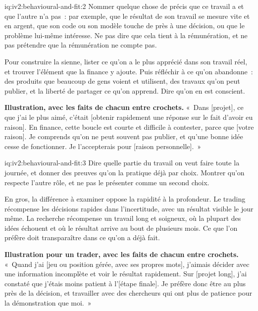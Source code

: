 \begin{solution}{iq:iv2:behavioural-and-fit:2}
Nommer quelque chose de précis que ce travail a et que l'autre n'a pas~: par exemple, que le résultat de son travail se mesure vite et en argent, que son code ou son modèle touche de près à une décision, ou que le problème lui-même intéresse. Ne pas dire que cela tient à la rémunération, et ne pas prétendre que la rémunération ne compte pas.

Pour construire la sienne, lister ce qu'on a le plus apprécié dans son travail réel, et trouver l'élément que la finance y ajoute. Puis réfléchir à ce qu'on abandonne~: des produits que beaucoup de gens voient et utilisent, des travaux qu'on peut publier, et la liberté de partager ce qu'on apprend. Dire qu'on en est conscient.

\textbf{Illustration, avec les faits de chacun entre crochets.} «~Dans [projet], ce que j'ai le plus aimé, c'était [obtenir rapidement une réponse sur le fait d'avoir eu raison]. En finance, cette boucle est courte et difficile à contester, parce que [votre raison]. Je comprends qu'on ne peut souvent pas publier, et qu'une bonne idée cesse de fonctionner. Je l'accepterais pour [raison personnelle].~»

\end{solution}

\begin{solution}{iq:iv2:behavioural-and-fit:3}
Dire quelle partie du travail on veut faire toute la journée, et donner des preuves qu'on la pratique déjà par choix. Montrer qu'on respecte l'autre rôle, et ne pas le présenter comme un second choix.

En gros, la différence à examiner oppose la rapidité à la profondeur. Le trading récompense les décisions rapides dans l'incertitude, avec un résultat visible le jour même. La recherche récompense un travail long et soigneux, où la plupart des idées échouent et où le résultat arrive au bout de plusieurs mois. Ce que l'on préfère doit transparaître dans ce qu'on a déjà fait.

\textbf{Illustration pour un trader, avec les faits de chacun entre crochets.} «~Quand j'ai [jeu ou position gérée, avec ses propres mots], j'aimais décider avec une information incomplète et voir le résultat rapidement. Sur [projet long], j'ai constaté que j'étais moins patient à l'[étape finale]. Je préfère donc être au plus près de la décision, et travailler avec des chercheurs qui ont plus de patience pour la démonstration que moi.~»

\end{solution}


